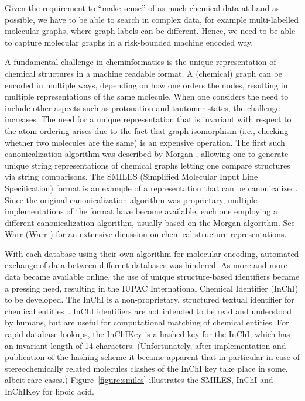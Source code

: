 \documentclass{sig-alternate}
\begin{document}
Given the requirement to ``make sense'' of as much chemical data at
hand as possible, we have to be able to search in complex data, for
example multi-labelled molecular graphs, where graph labels can be
different. Hence, we need to be able to capture molecular graphs in a
risk-bounded machine encoded way.

A fundamental challenge in cheminformatics is the unique
representation of chemical structures in a machine readable format. A
(chemical) graph can be encoded in multiple ways, depending on how one
orders the nodes, resulting in multiple representations of the same
molecule. When one considers the need to include other aspects such as
protonation and tautomer states, the challenge increases. The need for
a unique representation that is invariant with respect to the atom
ordering arises due to the fact that graph isomorphism (i.e., checking
whether two molecules are the same) is an expensive operation. The
first such canonicalization algorithm was described by Morgan
\cite{Morgan1965}, allowing one to generate unique string
representations of chemical graphs letting one compare structures via
string comparisons. The SMILES (Simplified Molecular Input Line
Specification) format \cite{Weininger:1988kx} is an example of a
representation that can be canonicalized. Since the original
canonicalization algorithm was proprietary, multiple implementations
of the format have become available, each one employing a different
canonicalization algorithm, usually based on the Morgan algorithm. See
Warr (Warr \cite{Warr:2011vn}) for an extensive dicussion on chemical
structure representations.

With each database using their own algorithm for molecular encoding,
automated exchange of data between different databases was hindered.
As more and more data became available online, the use of unique
structure-based identifiers became a pressing need, resulting in the
IUPAC International Chemical Identifier (InChI) to be developed. The
InChI is a non-proprietary, structured textual identifier for chemical
entities~\cite{inchi}. InChI identifiers are not intended to be read
and understood by humans, but are useful for computational matching of
chemical entities. For rapid database lookups, the InChIKey is a
hashed key for the InChI, which has an invariant length of 14
characters. (Unfortunately, after implementation and publication of
the hashing scheme it became apparent that in particular in case of
stereochemically related molecules clashes of the InChI key take place
in some, albeit rare cases.) Figure~\ref{figure:smiles} illustrates
the SMILES, InChI and InChIKey for lipoic acid.
\end{document}
